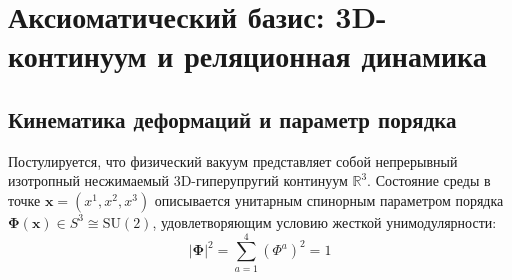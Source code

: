\documentclass[12pt,a4paper]{article}
\begin{document}
\begin{abstract}
		Нейтринный сектор дедуктивно замкнут через 1D-редукцию репера Френе-Серре ($5 \to 3$ степени свободы девиатора): получены амплитуда $A_{1D} = \sqrt{1.2}$, фундаментальный фазовый угол $\theta_\nu = \pi - q/p = \pi - 2/3$ рад и масштаб массы 1D-струны $\mathcal{M}_\nu = \frac{5}{6}\alpha^2(m_e^2/M_p) \approx 12.3495$ мэВ. Это дает абсолютно предсказанный спектр масс ($m_{\nu 1} = 0.239$ мэВ, $m_{\nu 2} = 8.793$ мэВ, $m_{\nu 3} = 50.247$ мэВ, $\sum m_\nu = 59.28$ мэВ) и расщеплений ($\Delta m_{21}^2 = 7.73 \times 10^{-5} \text{ эВ}^2$, $\Delta m_{32}^2 = 2.45 \times 10^{-3} \text{ эВ}^2$) без использования экспериментальных фитов осцилляций.
		
		Интегрирование стоячей волны на узле $T(3,2)$ порождает дробные заряды $(+2/3, +2/3, -1/3)e$, зарядовый ($r_c = 4\lambda_p \approx 0.841$ фм) и массовый ($R_m = 3\lambda_p \approx 0.631$ фм) радиусы, а также дефект массы нейтрона $\Delta m = \frac{3}{16}\alpha M_p \approx 1.2838$ МэВ. Вязкоупругость Кельвина-Фойхта объясняет времена жизни ($\tau_\mu \approx 2.197 \ \mu\text{с}$, $\tau_\tau \approx 2.90 \times 10^{-13}$ с) и разрешает аномалию времени жизни нейтрона («пучок-ловушка») как макроскопический топологический эффект Парселла ($\Delta\tau = \frac{4}{3}\alpha\tau_{\text{beam}} = 8.64$ с). Гравитация описана как индуцированная длинноволновая упругость Сахарова с регуляризацией сингулярностей за счет топологического развязывания узлов.
	\end{abstract}
	
	\tableofcontents
	\newpage
	
	\section{Аксиоматический базис: 3D-континуум и реляционная динамика}
	
	\subsection{Кинематика деформаций и параметр порядка}
	Постулируется, что физический вакуум представляет собой непрерывный изотропный несжимаемый 3D-гиперупругий континуум $\mathbb{R}^3$. Состояние среды в точке $\mathbf{x} = (x^1, x^2, x^3)$ описывается унитарным спинорным параметром порядка $\boldsymbol{\Phi}(\mathbf{x}) \in S^3 \cong \mathrm{SU}(2)$, удовлетворяющим условию жесткой унимодулярности:
	\begin{equation}
		|\boldsymbol{\Phi}|^2 = \sum_{a=1}^4 (\Phi^a)^2 = 1
	\end{equation}
	
\end{document}
